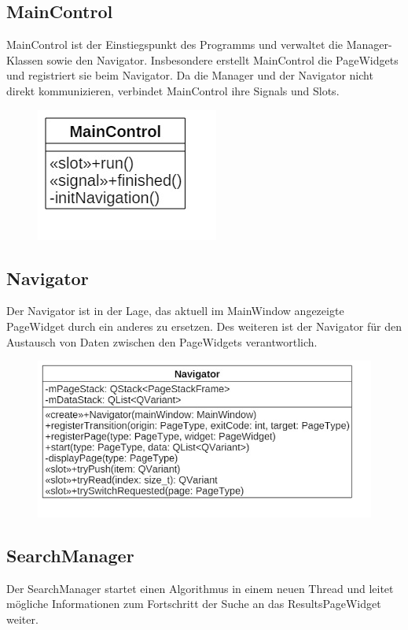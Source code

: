 \subsection*{MainControl}
MainControl ist der Einstiegspunkt des Programms und verwaltet die Manager-Klassen sowie den Navigator. Insbesondere erstellt MainControl die PageWidgets und registriert sie beim Navigator.
Da die Manager und der Navigator nicht direkt kommunizieren, verbindet MainControl ihre Signals und Slots.

\begin{figure}[H]
\centering
\includegraphics[scale=0.5]{img/Klassendiagramm/Klassen/Controller/MainControl}
\label{fig:mainControl}
\end{figure}

\subsection*{Navigator}
Der Navigator ist in der Lage, das aktuell im MainWindow angezeigte PageWidget durch ein anderes zu ersetzen. Des weiteren ist der Navigator für den Austausch von Daten zwischen den PageWidgets verantwortlich.

\begin{figure}[H]
\centering
\includegraphics[scale=0.5]{img/Klassendiagramm/Klassen/Controller/Navigator}
\label{fig:navigator}
\end{figure}

\subsection*{SearchManager}
Der SearchManager startet einen Algorithmus in einem neuen Thread und leitet mögliche Informationen zum Fortschritt der Suche an das ResultsPageWidget weiter.

